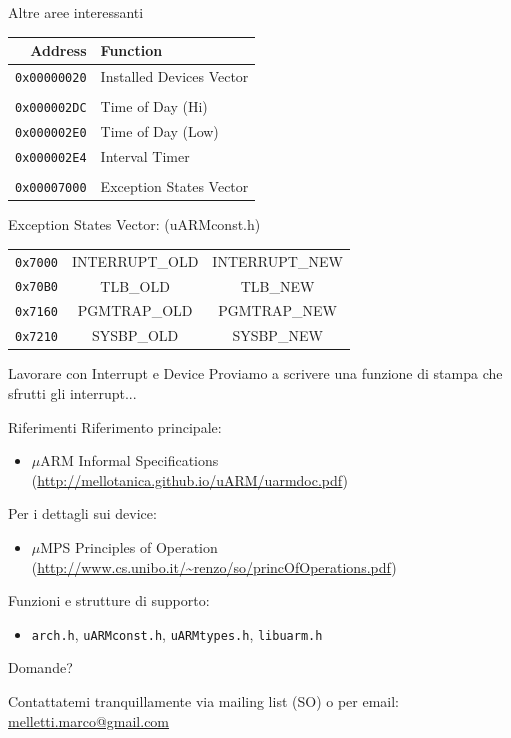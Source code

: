 \documentclass{beamer}
\begin{document}
\begin{frame}{Altre aree interessanti}
\small
\begin{tabular}{r|l}
	Address & Function \\
	\hline
	\texttt{0x00000020} & Installed Devices Vector \\
	\\
	\texttt{0x000002DC} & Time of Day (Hi) \\
	\texttt{0x000002E0} & Time of Day (Low) \\
	\texttt{0x000002E4} & Interval Timer \\
	\\
	\texttt{0x00007000} & Exception States Vector \\
\end{tabular}

\vfill

Exception States Vector: \hfill(uARMconst.h)

\vspace{5px}
\begin{tabular}{r|c|c|}
\cline{2-3}
\footnotesize\texttt{0x7000} & INTERRUPT\_OLD & INTERRUPT\_NEW \\
\cline{2-3}
\footnotesize\texttt{0x70B0} & TLB\_OLD & TLB\_NEW \\
\cline{2-3}
\footnotesize\texttt{0x7160} & PGMTRAP\_OLD & PGMTRAP\_NEW \\
\cline{2-3}
\footnotesize\texttt{0x7210} & SYSBP\_OLD & SYSBP\_NEW \\
\cline{2-3}
\end{tabular}
\end{frame}

\begin{frame}{Lavorare con Interrupt e Device}
Proviamo a scrivere una funzione di stampa che sfrutti gli interrupt... 
\end{frame}

\begin{frame}{Riferimenti}
Riferimento principale:

\begin{itemize}
\item $\mu$ARM Informal Specifications \small(\url{http://mellotanica.github.io/uARM/uarmdoc.pdf})
\end{itemize}

\vfill
Per i dettagli sui device:

\begin{itemize}
\item $\mu$MPS Principles of Operation \small(\url{http://www.cs.unibo.it/~renzo/so/princOfOperations.pdf})
\end{itemize}

\vfill
Funzioni e strutture di supporto:

\begin{itemize}
\item \texttt{arch.h}, \texttt{uARMconst.h}, \texttt{uARMtypes.h}, \texttt{libuarm.h}
\end{itemize}

\end{frame}

\begin{frame}

\vfill

\center\huge Domande?

\vfill
\normalsize Contattatemi tranquillamente via mailing list (SO) o per email: \url{melletti.marco@gmail.com}

\end{frame}
\end{document}
